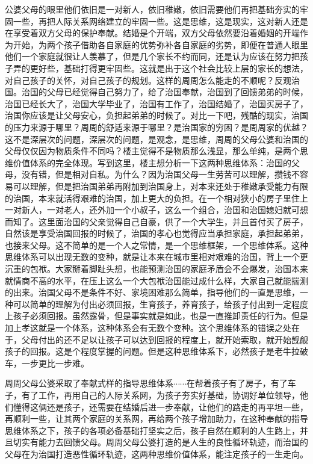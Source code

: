 公婆父母的眼里他们依旧是一对新人，依旧稚嫩，依旧需要他们再把基础夯实的牢固一些，再把人际关系网络建立的牢固一些。这是思维，这是现实，这对新人还是在享受着双方父母的保护奉献。结婚是个开端，双方父母依然要沿着婚姻的开端作为开始，为两个孩子借助各自家庭的优势弥补各自家庭的劣势，即便在普通人眼里他们一个家庭就很让人羡慕了，但是几个家长不约而同，还是认为应该在努力把孩子弄的更好些，基础打得更牢固些。这就是出于这个社会比较上层的家长的想法，对自己孩子的关怀，对自己孩子的规划。这样的周周怎么能走的不顺呢？反观治国。治国的父母已经觉得自己努力了，给了治国奉献，治国到了回馈弟弟的时候，治国已经长大了，治国大学毕业了，治国有工作了，治国结婚了，治国买房子了，治国你应该是让父母安心，负担起弟弟的时候了。对比一下吧，残酷的现实，治国的压力来源于哪里？周周的舒适来源于哪里？是治国家的穷困？是周周家的优越？这不是深层次的问题，深层次的问题，是观念，是思维，周周的父母公婆和治国的父母仅仅因为物质条件不同吗？楼主觉得不是物质那么浅显，那么单纯，是两个思维价值体系的完全体现。写到这里，楼主想分析一下这两种思维体系：治国的父母，没有错，但是相对自私。为什么？因为治国父母一生劳苦可以理解，攒钱不容易可以理解，但是把治国弟弟再附加到治国身上，对本来还处于稚嫩承受能力有限的治国，本来就活得艰难的治国，加上更大的负担。在一个相对狭小的房子里住上一对新人，一对老人，还外加一个小叔子，这么一个组合，治国和治国媳妇就可想而知了。这里面治国的父亲觉得自己自豪，供了一个大学生，并且首付买了房子，自然该是享受治国回报的时候了，治国的孝心也觉得应当承担家庭，承担起弟弟，也接来父母。这不简单的是一个人之常情，是一个思维框架，一个思维体系。这种思维体系可以出现无数的变种，就是让本来在城市里相对艰难的治国，背上一个更沉重的包袱。大家掰着脚趾头想，也能预测治国的家庭矛盾会不会爆发，治国本来就情商不高的水平，在压上这么一个大包袱治国能过成什么样，大家自己就能揣测的出来。治国父母不是条件不好、家境困难那么简单，指导他们的一直是思维，一种可以简单的理解为付出必须回报，生育孩子，养育孩子，给孩子付出到一定程度上孩子必须回报。虽然露骨，但是事实就是如此，也是一直推卸责任的行为。但是加上孝这就是一个体系，这种体系会有无数个变种。这个思维体系的错误之处在于，父母付出的还不足以让孩子可以达到回报的程度上，就开始索取，就开始觊觎孩子的回报。这是个程度掌握的问题。但是这种思维体系下，必然孩子是老牛拉破车，一步更比一步难。

周周父母公婆采取了奉献式样的指导思维体系$\cdots\cdots$在帮着孩子有了房子，有了车子，有了工作，再用自己的人际关系网，为孩子夯实好基础，协调好单位领导，他们懂得这俩还是孩子，还需要在结婚后进一步奉献，让他们的路走的再平坦一些，再顺利一些，让其两个家庭的关系网，再给两个孩子增加助力，在这种奉献的指导思维体系之下，孩子的各项必备基础打坚实之后，孩子自然在顺利的人生路上，并且切实有能力去回馈父母。周周父母公婆打造的是人生的良性循环轨迹，而治国的父母在为治国打造恶性循环轨迹，这两种思维价值体系，能注定孩子的一生走向。

